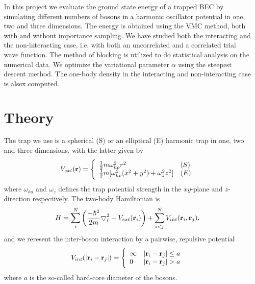 \documentclass[english, a4paper]{article}
\begin{document}
\noindent In this project we evaluate the ground state energy of a trapped BEC by simulating different numbers of bosons
in a harmonic oscillator potential in one, two and three dimensions. The energy is obtained using the VMC method, both with 
and without importance sampling. We have studied both the interacting and the non-interacting case, i.e. with both 
an uncorrelated and a correlated trial wave function. The method of blocking is utilized to do statistical analysis on
the numerical data. We optimize the variational parameter $\alpha$ using the steepest descent method. The one-body 
density in the interacting and non-interacting case is alsox computed. 


\section*{Theory}
The trap we use is a spherical (S) or an elliptical (E) harmonic trap in one, two and three dimensions, with the latter given by
\begin{equation}
 V_{ext}({\bf r}) = 
 \Bigg\{
\begin{array}{ll}
	 \frac{1}{2}m\omega_{ho}^2r^2 & (S)\\
 \strut
	 \frac{1}{2}m[\omega_{ho}^2(x^2+y^2) + \omega_z^2z^2] & (E)
 \label{trap_eqn}
\end{array}
\end{equation}
where $\omega_{ho}$ and $\omega_z$ defines the trap potential strength in the $xy$-plane and $z$-direction respectively.
The two-body Hamiltonian is
 \begin{equation}
     H = \sum_i^N \left(
	 \frac{-\hbar^2}{2m}
	 { \bigtriangledown }_{i}^2 +
	 V_{ext}({\bf{r}}_i)\right)  +
	 \sum_{i<j}^{N} V_{int}({\bf{r}}_i,{\bf{r}}_j),
 \end{equation}
 and we reresent the inter-boson interaction by a pairwise, repulsive potential
 \begin{equation}
 V_{int}(|{\bf r}_i-{\bf r}_j|) =  \Bigg\{
 \begin{array}{ll}
	 \infty & {|{\bf r}_i-{\bf r}_j|} \leq {a}\\
	 0 & {|{\bf r}_i-{\bf r}_j|} > {a}
 \end{array}
 \end{equation}
 where ${a}$ is the so-called hard-core diameter of the bosons.
 
\end{document}
